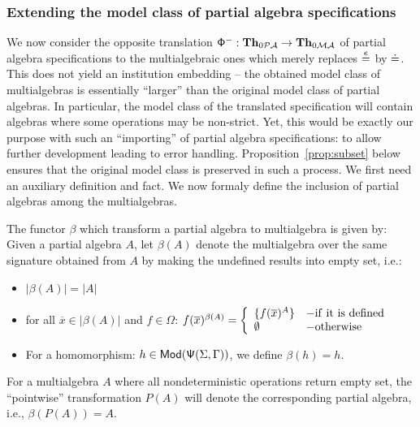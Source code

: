 \documentclass[10pt]{article}
\begin{document}
\subsubsection{Extending the model class of partial algebra specifications}
We now consider the opposite translation
${\sf {\Phi}}^-:{\bf Th}_{0{\mathcal{PA}}}\to{\bf Th}_{0{\mathcal{MA}}}$ of partial
algebra specifications to the multialgebraic ones which merely replaces $\stackrel{e}{=}$ by $\mathrel{\dot{=} }$. 
This does not yield an institution embedding -- the obtained model class of
multialgebras is essentially ``larger'' than the original model class of
partial algebras. In particular, the model class of the translated
specification will contain algebras where some operations may be non-strict. 
Yet, this would be exactly our purpose with such an ``importing'' of partial
algebra specifications: to allow further development leading to error
handling. Proposition~\ref{prop:subset} below ensures that the original model
class is preserved in such a process. We first need an auxiliary definition
and fact.
%
We now formaly define the inclusion of partial algebras among the multialgebras.
\begin{definition}\label{de:MP}
The functor $\beta$ which transform a partial algebra to multialgebra is given by:
Given a partial algebra $A$, let $\beta(A)$ denote the multialgebra over the same
signature obtained from
$A$ by making the undefined results into empty set, i.e.:
\begin{itemize}\MyLPar
\item $|\beta(A)|=|A|$
\item for all $\overline x\in |\beta(A)|$ and $f\in\Omega$:
$f(\overline x)^{\beta(A)}= \left\{\begin{array}{ll}\{f(\overline x)^A\} & - {\rm
if\ it\ is\ defined}\\
\emptyset & - {\rm otherwise} \end{array}\right.$
\item For a homomorphism:  $h \in {\sf {Mod}}({\sf {\Psi}}(\Sigma,\Gamma))$, we define $\beta(h) = h$.
\end{itemize}
For a multialgebra $A$ where all nondeterministic operations return empty
set, the ``pointwise'' transformation $P(A)$ will denote the corresponding partial algebra, i.e., $\beta(P(A))=A$.
\end{definition}
\end{document}
